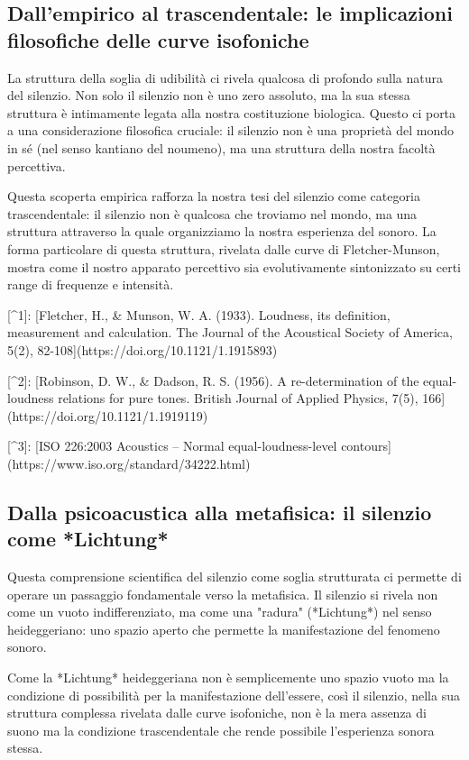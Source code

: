 \documentclass[a4paper,11pt]{article}
\begin{document}
\subsection{Dall'empirico al trascendentale: le implicazioni filosofiche delle curve isofoniche}

La struttura della soglia di udibilità ci rivela qualcosa di profondo
sulla natura del silenzio. Non solo il silenzio non è uno zero assoluto,
ma la sua stessa struttura è intimamente legata alla nostra costituzione
biologica. Questo ci porta a una considerazione filosofica cruciale: il
silenzio non è una proprietà del mondo in sé (nel senso kantiano del
noumeno), ma una struttura della nostra facoltà percettiva.

Questa scoperta empirica rafforza la nostra tesi del silenzio come
categoria trascendentale: il silenzio non è qualcosa che troviamo nel
mondo, ma una struttura attraverso la quale organizziamo la nostra
esperienza del sonoro. La forma particolare di questa struttura,
rivelata dalle curve di Fletcher-Munson, mostra come il nostro apparato
percettivo sia evolutivamente sintonizzato su certi range di frequenze e
intensità.

[^1]: [Fletcher, H., & Munson, W. A. (1933). Loudness, its definition,
    measurement and calculation. The Journal of the Acoustical Society
    of America, 5(2), 82-108](https://doi.org/10.1121/1.1915893)

[^2]: [Robinson, D. W., & Dadson, R. S. (1956). A re-determination of
    the equal-loudness relations for pure tones. British Journal of
    Applied Physics, 7(5), 166](https://doi.org/10.1121/1.1919119)

[^3]: [ISO 226:2003 Acoustics -- Normal equal-loudness-level
    contours](https://www.iso.org/standard/34222.html)


\subsection{Dalla psicoacustica alla metafisica: il silenzio come *Lichtung*}

Questa comprensione scientifica del silenzio come soglia strutturata ci
permette di operare un passaggio fondamentale verso la metafisica. Il
silenzio si rivela non come un vuoto indifferenziato, ma come una
"radura" (*Lichtung*) nel senso heideggeriano: uno spazio aperto che
permette la manifestazione del fenomeno sonoro.

Come la *Lichtung* heideggeriana non è semplicemente uno spazio vuoto ma
la condizione di possibilità per la manifestazione dell'essere, così il
silenzio, nella sua struttura complessa rivelata dalle curve isofoniche,
non è la mera assenza di suono ma la condizione trascendentale che rende
possibile l'esperienza sonora stessa.
\end{document}
